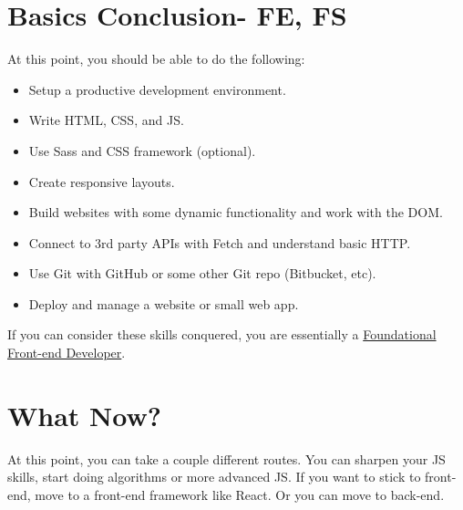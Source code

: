 \section{Basics Conclusion- FE, FS}
At this point, you should be able to do the following: 
\begin{itemize}
    \item Setup a productive development environment.
    \item Write HTML, CSS, and JS.
    \item Use Sass and CSS framework (optional).
    \item Create responsive layouts.
    \item Build websites with some dynamic functionality and work with the DOM.
    \item Connect to 3rd party APIs with Fetch and understand basic HTTP.
    \item Use Git with GitHub or some other Git repo (Bitbucket, etc).
    \item Deploy and manage a website or small web app.
\end{itemize}

If you can consider these skills conquered, you are essentially a \uline{Foundational Front-end Developer}.

\section{What Now?}
At this point, you can take a couple different routes. You can sharpen your JS skills, start doing algorithms or more advanced JS. If you want to stick to front-end, move to a front-end framework like React. Or you can move to back-end.
